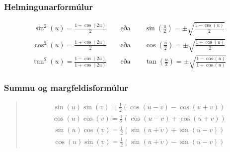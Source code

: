 \documentclass[a4paper,10pt,icelandic]{sphinxmanual}
\begin{document}
\subsubsection{Helmingunarformúlur}
\label{\detokenize{Kafli12:helmingunarformulur}}
\begin{equation*}
\begin{split}\sin^2(u) = \frac{1- \cos(2u)}{2} \qquad \text{eða} \qquad \sin\left(\frac{u}{2}\right) = \pm \sqrt{\frac{1- \cos(u)}{2} }\end{split}
\end{equation*}
\begin{equation*}
\begin{split}\cos^2(u) = \frac{1+ \cos(2u)}{2} \qquad \text{eða} \qquad \cos\left(\frac{u}{2}\right) = \pm \sqrt{\frac{1+ \cos(u)}{2} }\end{split}
\end{equation*}
\begin{equation*}
\begin{split}\tan^2(u) = \frac{1- \cos(2u)}{1+\cos(2u)} \qquad \text{eða} \qquad \tan\left(\frac{u}{2}\right) = \pm \sqrt{\frac{1- \cos(u)}{1+\cos(u)} }\end{split}
\end{equation*}

\subsubsection{Summu\sphinxhyphen{} og margfeldisformúlur}
\label{\detokenize{Kafli12:summu-og-margfeldisformulur}}
\begin{quote}

\begin{equation*}
\begin{split}\sin(u)\sin(v) = \frac{1}{2}\left(\cos(u-v) - \cos(u+v)\right)\end{split}
\end{equation*}
\begin{equation*}
\begin{split}\cos(u)\cos(v) = \frac{1}{2}\left(\cos(u-v) + \cos(u+v)\right)\end{split}
\end{equation*}
\begin{equation*}
\begin{split}\sin(u)\cos(v) = \frac{1}{2}\left(\sin(u+v) + \sin(u-v)\right)\end{split}
\end{equation*}
\begin{equation*}
\begin{split}\cos(u)\sin(v) = \frac{1}{2}\left(\sin(u+v) - \sin(u-v)\right)\end{split}
\end{equation*}\end{quote}
\end{document}
